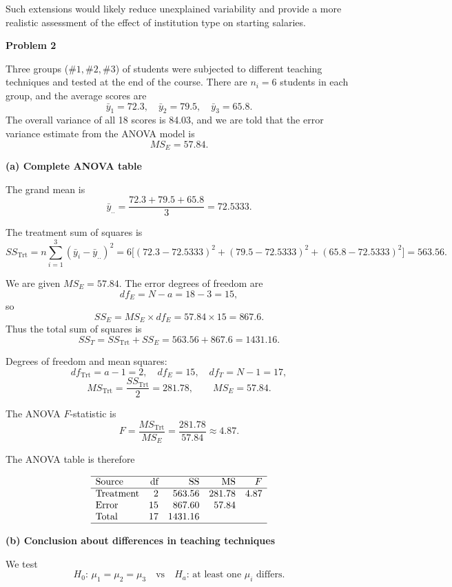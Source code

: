 \documentclass[answers,12pt,addpoints]{exam}
\begin{document}
Such extensions would likely reduce unexplained variability and provide a more
realistic assessment of the effect of institution type on starting salaries.

\textbf{Problem 2}

Three groups ($\#1,\#2,\#3$) of students were subjected to different teaching
techniques and tested at the end of the course. There are $n_i = 6$ students in
each group, and the average scores are
\[
\bar{y}_1 = 72.3,\quad \bar{y}_2 = 79.5,\quad \bar{y}_3 = 65.8.
\]
The overall variance of all 18 scores is 84.03, and we are told that the error
variance estimate from the ANOVA model is
\[
MS_E = 57.84.
\]

\medskip
\textbf{(a) Complete ANOVA table}

The grand mean is
\[
\bar{y}_{..} = \frac{72.3 + 79.5 + 65.8}{3} = 72.5333.
\]

The treatment sum of squares is
\[
SS_{\text{Trt}}
= n\sum_{i=1}^3(\bar{y}_i - \bar{y}_{..})^2
= 6\bigl[(72.3-72.5333)^2 + (79.5-72.5333)^2 + (65.8-72.5333)^2\bigr]
= 563.56.
\]

We are given $MS_E = 57.84$. The error degrees of freedom are
\[
df_E = N-a = 18-3 = 15,
\]
so
\[
SS_E = MS_E \times df_E = 57.84 \times 15 = 867.6.
\]
Thus the total sum of squares is
\[
SS_T = SS_{\text{Trt}} + SS_E = 563.56 + 867.6 = 1431.16.
\]

Degrees of freedom and mean squares:
\[
df_{\text{Trt}} = a-1 = 2,\quad df_E = 15,\quad df_T = N-1 = 17,
\]
\[
MS_{\text{Trt}} = \frac{SS_{\text{Trt}}}{2} = 281.78,\qquad
MS_E = 57.84.
\]

The ANOVA $F$-statistic is
\[
F = \frac{MS_{\text{Trt}}}{MS_E}
= \frac{281.78}{57.84} \approx 4.87.
\]

The ANOVA table is therefore

\[
\begin{array}{lrrrr}
\hline
\text{Source} & \text{df} & \text{SS} & \text{MS} & F \\
\hline
\text{Treatment} & 2  & 563.56 & 281.78 & 4.87 \\
\text{Error}     & 15 & 867.60 & 57.84  &      \\
\text{Total}     & 17 & 1431.16&        &      \\
\hline
\end{array}
\]

\medskip
\textbf{(b) Conclusion about differences in teaching techniques}

We test
\[
H_0:\,\mu_1 = \mu_2 = \mu_3
\quad\text{vs}\quad
H_a:\,\text{at least one }\mu_i\text{ differs}.
\]
\end{document}
